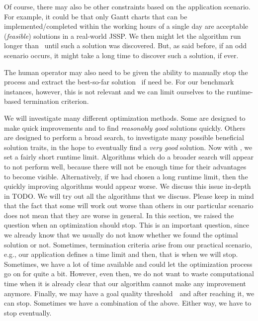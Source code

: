Of course, there may also be other constraints based on the application scenario.
For example, it could be that only Gantt charts that can be implemented/completed within the working hours of a single day are acceptable (\emph{feasible}) solutions in a real-world \gls{JSSP}.
We then might let the algorithm run longer than \jsspRuntime\ until such a solution was discovered.
But, as said before, if an odd scenario occurs, it might take a long time to discover such a solution, if ever.

The human operator may also need to be given the ability to manually stop the process and extract the best-so-far solution~\bestSoFarOf{\solspel} if need be.
For our benchmark instances, however, this is not relevant and we can limit ourselves to the runtime-based termination criterion.

We will investigate many different optimization methods.
Some are designed to make quick improvements and to find \emph{reasonably good} solutions quickly.
Others are designed to perform a broad search, to investigate many possible beneficial solution traits, in the hope to eventually find a \emph{very good} solution.
Now with \jsspRuntime, we set a fairly short runtime limit.
Algorithms which do a broader search will appear to not perform well, because there will not be enough time for their advantages to become visible.
Alternatively, if we had chosen a long runtime limit, then the quickly improving algorithms would appear worse.
We discuss this issue in-depth in TODO.
We will try out all the algorithms that we discuss.
Please keep in mind that the fact that some will work out worse than others in our particular scenario does not mean that they are worse in general.
\endhsection%
%
%
In this section, we raised the question when an optimization should stop.
This is an important question, since we already know that we usually do not know whether we found the optimal solution or not.
Sometimes, termination criteria arise from our practical scenario, e.g., our application defines a time limit and then, that is when we will stop.
Sometimes, we have a lot of time available and could let the optimization process go on for quite a bit.
However, even then, we do not want to waste computational time when it is already clear that our algorithm cannot make any improvement anymore.
Finally, we may have a goal quality threshold~\goalF\ and after reaching it, we can stop.
Sometimes we have a combination of the above.
Either way, we have to stop eventually.%
\endhsection%
\endhsection%
%

